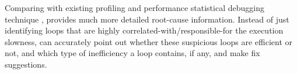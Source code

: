 Comparing with existing profiling and performance
statistical debugging technique \cite{SongOOPSLA2014}, \Tool provides much
more detailed root-cause information. Instead of just identifying loops that
are highly correlated-with/responsible-for the execution slowness, \Tool
can accurately point out whether these suspicious loops are efficient or not,
and which type of inefficiency a loop contains, if any, and make fix suggestions.
